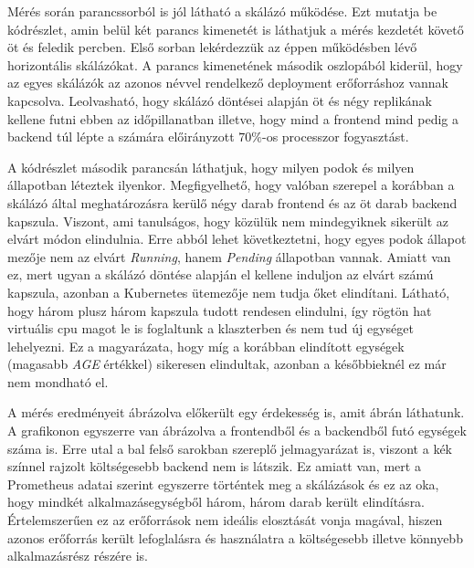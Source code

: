 Mérés során parancssorból is jól látható a skálázó működése. 
Ezt mutatja be  kódrészlet, amin belül két parancs kimenetét is láthatjuk a mérés kezdetét követő öt és feledik percben.
Első sorban lekérdezzük az éppen működésben lévő horizontális skálázókat. 
A parancs kimenetének második oszlopából kiderül, hogy az egyes skálázók az azonos névvel rendelkező deployment erőforráshoz vannak kapcsolva.
Leolvasható, hogy skálázó döntései alapján öt és négy replikának kellene futni ebben az időpillanatban illetve, hogy mind a frontend mind pedig a backend túl lépte a számára előirányzott $70\%$-os processzor fogyasztást.

A kódrészlet második parancsán láthatjuk, hogy milyen podok és milyen állapotban léteztek ilyenkor.
Megfigyelhető, hogy valóban szerepel a korábban a skálázó által meghatározásra kerülő négy darab frontend és az öt darab backend kapszula.
Viszont, ami tanulságos, hogy közülük nem mindegyiknek sikerült az elvárt módon elindulnia.
Erre abból lehet következtetni, hogy egyes podok állapot mezője nem az elvárt \textit{Running}, hanem \textit{Pending} állapotban vannak.
Amiatt van ez, mert ugyan a skálázó döntése alapján el kellene induljon az elvárt számú kapszula, azonban a Kubernetes ütemezője nem tudja őket elindítani.
Látható, hogy három plusz három kapszula tudott rendesen elindulni, így rögtön hat virtuális cpu magot le is foglaltunk a klaszterben és nem tud új egységet lehelyezni.
Ez a magyarázata, hogy míg a korábban elindított egységek (magasabb \textit{AGE} értékkel) sikeresen elindultak, azonban a későbbieknél ez már nem mondható el.

\lstset{caption=Horizontális skálázóval történő mérés, label=hpa_measurement_pending}


A mérés eredményeit ábrázolva előkerült egy érdekesség is, amit  ábrán láthatunk.
A grafikonon egyszerre van ábrázolva a frontendből és a backendből futó egységek száma is.
Erre utal a bal felső sarokban szereplő jelmagyarázat is, viszont a kék színnel rajzolt költségesebb backend nem is látszik.
Ez amiatt van, mert a Prometheus adatai szerint egyszerre történtek meg a skálázások és ez az oka, hogy mindkét alkalmazásegységből három, három darab került elindításra.
Értelemszerűen ez az erőforrások nem ideális elosztását vonja magával, hiszen azonos erőforrás került lefoglalásra és használatra a költségesebb illetve könnyebb alkalmazásrész részére is.

